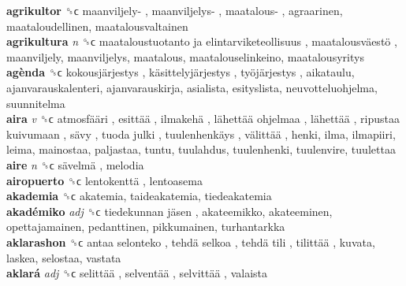 \textbf{agrikultor} ␝ϲ   maanviljely- ,  maanviljelys- ,  maatalous- , agraarinen, maataloudellinen, maatalousvaltainen  \\
\textbf{agrikultura} \emph{n}  ␝ϲ   maataloustuotanto ja elintarviketeollisuus ,  maatalousväestö , maanviljely, maanviljelys, maatalous, maatalouselinkeino, maatalousyritys  \\
\textbf{agènda} ␝ϲ   kokousjärjestys ,  käsittelyjärjestys ,  työjärjestys , aikataulu, ajanvarauskalenteri, ajanvarauskirja, asialista, esityslista, neuvotteluohjelma, suunnitelma  \\
\textbf{aira} \emph{v}  ␝ϲ   atmosfääri ,  esittää ,  ilmakehä ,  lähettää ohjelmaa ,  lähettää ,  ripustaa kuivumaan ,  sävy ,  tuoda julki ,  tuulenhenkäys ,  välittää , henki, ilma, ilmapiiri, leima, mainostaa, paljastaa, tuntu, tuulahdus, tuulenhenki, tuulenvire, tuulettaa  \\
\textbf{aire} \emph{n}  ␝ϲ   sävelmä , melodia  \\
\textbf{airopuerto} ␝ϲ   lentokenttä , lentoasema  \\
\textbf{akademia} ␝ϲ  akatemia, taideakatemia, tiedeakatemia  \\
\textbf{akadémiko} \emph{adj}  ␝ϲ   tiedekunnan jäsen , akateemikko, akateeminen, opettajamainen, pedanttinen, pikkumainen, turhantarkka  \\
\textbf{aklarashon} ␝ϲ   antaa selonteko ,  tehdä selkoa ,  tehdä tili ,  tilittää , kuvata, laskea, selostaa, vastata  \\
\textbf{aklará} \emph{adj}  ␝ϲ   selittää ,  selventää ,  selvittää , valaista  \\
